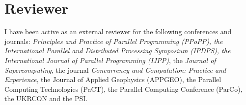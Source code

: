 \documentclass[11pt,a4paper,sans]{moderncv}        %
\begin{document}
\section{Reviewer}

				 {I have been active as an external reviewer for the following conferences and journals:
                  \emph{Principles and Practice of Parallel Programming (PPoPP),
                    the International Parallel and Distributed Processing Symposium (IPDPS),
                    the International Journal of Parallel Programming (IJPP)},
					the \emph{Journal of Supercomputing},
					the journal \emph{Concurrency and Computation: Practice and Experience},
                    the Journal of Applied Geophysics (APPGEO),
					the Parallel Computing Technologies (PaCT),
					the Parallel Computing Conference (ParCo),
					the UKRCON
					and the PSI.
				 }


\end{document}
